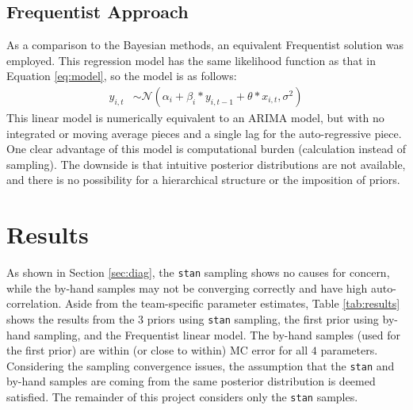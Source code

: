 \documentclass[11pt]{article}
\newcommand{\code}{\texttt}
\begin{document}
\vspace*{-.5\baselineskip}
\subsection{Frequentist Approach}

As a comparison to the Bayesian methods, an equivalent Frequentist solution was employed. This regression model has the same likelihood function as that in Equation \ref{eq:model}, so the model is as follows:
\begin{align}\label{eq:likelihood}
    y_{i,t}&\sim\mathcal{N}\left(\alpha_i+{\beta_i} * y_{i,t-1} +\theta * x_{i,t},\sigma^2\right)
\end{align}
This linear model is numerically equivalent to an ARIMA model, but with no integrated or moving average pieces and a single lag for the auto-regressive piece. One clear advantage of this model is computational burden (calculation instead of sampling). The downside is that intuitive posterior distributions are not available, and there is no possibility for a hierarchical structure or the imposition of priors. 

\vspace*{-.5\baselineskip}
\section{Results}

As shown in Section \ref{sec:diag}, the \code{stan} sampling shows no causes for concern, while the by-hand samples may not be converging correctly and have high auto-correlation. Aside from the team-specific parameter estimates, Table \ref{tab:results} shows the results from the 3 priors using \code{stan} sampling, the first prior using by-hand sampling, and the Frequentist linear model. The by-hand samples (used for the first prior) are within (or close to within) MC error for all $4$ parameters. Considering the sampling convergence issues, the assumption that the \code{stan} and by-hand samples are coming from the same posterior distribution is deemed satisfied. The remainder of this project considers only the \code{stan} samples. 
\end{document}
